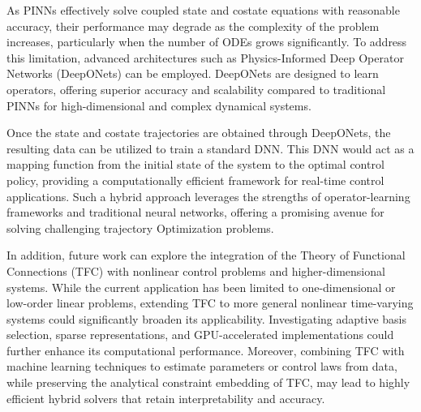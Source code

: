 \documentclass[
  number,
  preprint]{elsarticle}
\begin{document}
As PINNs effectively solve coupled state and costate equations with
reasonable accuracy, their performance may degrade as the complexity of
the problem increases, particularly when the number of ODEs grows
significantly. To address this limitation, advanced architectures such
as Physics-Informed Deep Operator Networks (DeepONets) can be employed.
DeepONets are designed to learn operators, offering superior accuracy
and scalability compared to traditional PINNs for high-dimensional and
complex dynamical systems.

Once the state and costate trajectories are obtained through DeepONets,
the resulting data can be utilized to train a standard DNN. This DNN
would act as a mapping function from the initial state of the system to
the optimal control policy, providing a computationally efficient
framework for real-time control applications. Such a hybrid approach
leverages the strengths of operator-learning frameworks and traditional
neural networks, offering a promising avenue for solving challenging
trajectory Optimization problems.

In addition, future work can explore the integration of the Theory of
Functional Connections (TFC) with nonlinear control problems and
higher-dimensional systems. While the current application has been
limited to one-dimensional or low-order linear problems, extending TFC
to more general nonlinear time-varying systems could significantly
broaden its applicability. Investigating adaptive basis selection,
sparse representations, and GPU-accelerated implementations could
further enhance its computational performance. Moreover, combining TFC
with machine learning techniques to estimate parameters or control laws
from data, while preserving the analytical constraint embedding of TFC,
may lead to highly efficient hybrid solvers that retain interpretability
and accuracy.

\newpage



\end{document}
